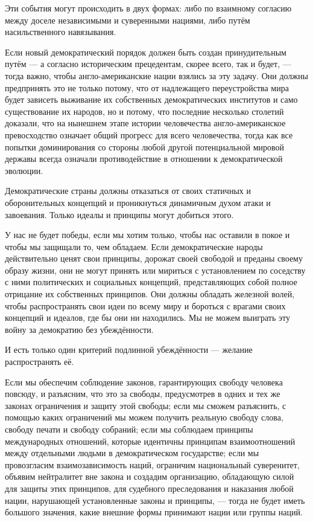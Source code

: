 Эти события могут происходить в двух формах: либо по взаимному согласию между доселе независимыми и суверенными нациями, либо путём насильственного навязывания.
 
Если новый демократический порядок должен быть создан принудительным путём — а согласно историческим прецедентам, скорее всего, так и будет, — тогда важно, чтобы англо-американские нации взялись за эту задачу. Они должны предпринять это не только потому, что от надлежащего переустройства мира будет зависеть выживание их собственных демократических институтов и само существование их народов, но и потому, что последние несколько столетий доказали, что на нынешнем этапе истории человечества англо-американское превосходство означает общий прогресс для всего человечества, тогда как все попытки доминирования со стороны любой другой потенциальной мировой державы всегда означали противодействие в отношении к демократической эволюции.

Демократические страны должны отказаться от своих статичных и оборонительных концепций и проникнуться динамичным духом атаки и завоевания. Только идеалы и принципы могут добиться этого.
 
У нас не будет победы, если мы хотим только, чтобы нас оставили в покое и чтобы мы защищали то, чем обладаем. Если демократические народы действительно ценят свои принципы, дорожат своей свободой и преданы своему образу жизни, они не могут принять или мириться с установлением по соседству с ними политических и социальных концепций, представляющих собой полное отрицание их собственных принципов. Они должны обладать железной волей, чтобы распространять свои идеи по всему миру и бороться с врагами своих концепций и идеалов, где бы они ни находились. Мы не можем выиграть эту войну за демократию без убеждённости.

И есть только один критерий подлинной убеждённости — желание распространять её.
 
Если мы обеспечим соблюдение законов, гарантирующих свободу человека повсюду, и разъясним, что это за свободы, предусмотрев в одних и тех же законах ограничения и защиту этой свободы; если мы сможем разъяснить, с помощью каких ограничений мы можем получить реальную свободу слова, свободу печати и свободу собраний; если мы соблюдаем принципы международных отношений, которые идентичны принципам взаимоотношений между отдельными людьми в демократическом государстве; если мы провозгласим взаимозависимость наций, ограничим национальный суверенитет, объявим нейтралитет вне закона и создадим организацию, обладающую силой для защиты этих принципов, для судебного преследования и наказания любой нации, нарушающей установленные законы и принципы, — тогда не будет иметь большого значения, какие внешние формы принимают нации или группы наций.

